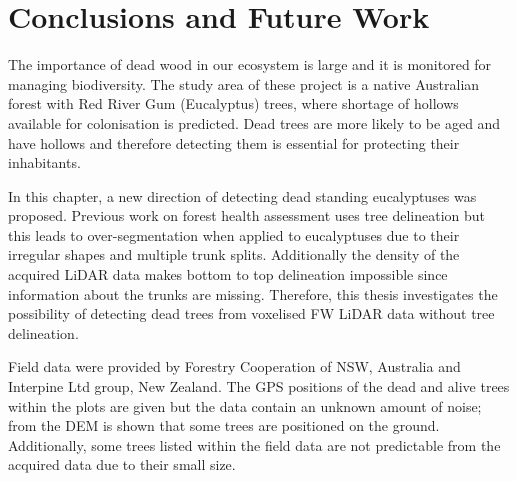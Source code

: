 \documentclass{subfiles}
\begin{document}



		
\section{Conclusions and Future Work}

\par The importance of dead wood in our ecosystem is large and it is monitored for managing biodiversity. The study area of these project is a native Australian forest with Red River Gum (Eucalyptus) trees, where shortage of hollows available for colonisation is predicted. Dead trees are more likely to be aged and have hollows and therefore detecting them is essential for protecting their inhabitants. 



\par In this chapter, a new direction of detecting dead standing eucalyptuses was proposed. Previous work on forest health assessment uses tree delineation but this leads to over-segmentation when applied to eucalyptuses due to their irregular shapes and multiple trunk splits. Additionally the density of the acquired LiDAR data makes bottom to top delineation impossible since information about the trunks are missing. Therefore, this thesis investigates the possibility of detecting dead trees from voxelised FW LiDAR data without tree delineation. 

\par Field data were provided by Forestry Cooperation of NSW, Australia and Interpine Ltd group, New Zealand. The GPS positions of the dead and alive trees within the plots are given but the data contain an unknown amount of noise; from the DEM is shown that some trees are positioned on the ground. Additionally, some trees listed within the field data are not predictable from the acquired data due to their small size. 
\end{document}
